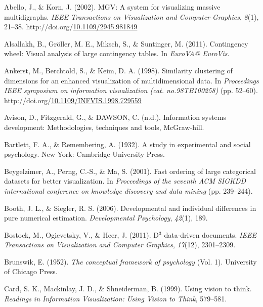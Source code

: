 \documentclass[print]{nuthesis}
\newlength{\cslhangindent}
\newenvironment{CSLReferences}[2]%
{\setlength{\parindent}{0pt}%
\everypar{\setlength{\hangindent}{\cslhangindent}}\ignorespaces}%
{\par}
\begin{document}
\hypertarget{refs}{}
\begin{CSLReferences}{1}{0}
\leavevmode\hypertarget{ref-abello2002}{}%
Abello, J., \& Korn, J. (2002). MGV: A system for visualizing massive multidigraphs. \emph{IEEE Transactions on Visualization and Computer Graphics}, \emph{8}(1), 21--38. http://doi.org/\href{https://doi.org/10.1109/2945.981849}{10.1109/2945.981849}

\leavevmode\hypertarget{ref-alsallakh2011}{}%
Alsallakh, B., Gröller, M. E., Miksch, S., \& Suntinger, M. (2011). Contingency wheel: Visual analysis of large contingency tables. In \emph{EuroVA@ EuroVis}.

\leavevmode\hypertarget{ref-ankerst1998}{}%
Ankerst, M., Berchtold, S., \& Keim, D. A. (1998). Similarity clustering of dimensions for an enhanced visualization of multidimensional data. In \emph{Proceedings IEEE symposium on information visualization (cat. no.98TB100258)} (pp. 52--60). http://doi.org/\href{https://doi.org/10.1109/INFVIS.1998.729559}{10.1109/INFVIS.1998.729559}

\leavevmode\hypertarget{ref-avison1995}{}%
Avison, D., Fitzgerald, G., \& DAWSON, C. (n.d.). Information systems development: Methodologies, techniques and tools, McGraw-hill.

\leavevmode\hypertarget{ref-bartlett1932}{}%
Bartlett, F. A., \& Remembering, A. (1932). A study in experimental and social psychology. New York: Cambridge University Press.

\leavevmode\hypertarget{ref-beygelzimer2001}{}%
Beygelzimer, A., Perng, C.-S., \& Ma, S. (2001). Fast ordering of large categorical datasets for better visualization. In \emph{Proceedings of the seventh ACM SIGKDD international conference on knowledge discovery and data mining} (pp. 239--244).

\leavevmode\hypertarget{ref-booth2006}{}%
Booth, J. L., \& Siegler, R. S. (2006). Developmental and individual differences in pure numerical estimation. \emph{Developmental Psychology}, \emph{42}(1), 189.

\leavevmode\hypertarget{ref-bostock2011}{}%
Bostock, M., Ogievetsky, V., \& Heer, J. (2011). D\(^3\) data-driven documents. \emph{IEEE Transactions on Visualization and Computer Graphics}, \emph{17}(12), 2301--2309.

\leavevmode\hypertarget{ref-brunswik1952}{}%
Brunswik, E. (1952). \emph{The conceptual framework of psychology} (Vol. 1). University of Chicago Press.

\leavevmode\hypertarget{ref-card1999}{}%
Card, S. K., Mackinlay, J. D., \& Shneiderman, B. (1999). Using vision to think. \emph{Readings in Information Visualization: Using Vision to Think}, 579--581.


\end{CSLReferences}
\end{document}
